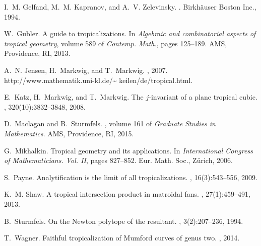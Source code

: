 \documentclass[11pt]{amsart}
\numberwithin{equation}{section}
\theoremstyle{plain}
\theoremstyle{definition}
\theoremstyle{remark}
\begin{document}
\begin{thebibliography}{10}
I.~M. Gelfand, M.~M. Kapranov, and A.~V. Zelevinsky.
.
\newblock Birkh\"auser Boston Inc., 1994.

W.~Gubler.
\newblock A guide to tropicalizations.
\newblock In {\em Algebraic and combinatorial aspects of tropical geometry},
  volume 589 of {\em Contemp. Math.}, pages 125--189. AMS,
  Providence, RI, 2013.

A.~N. Jensen, H.~Markwig, and T.~Markwig.
, 2007.
\newblock http://www.mathematik.uni-kl.de/\textasciitilde
  keilen/de/tropical.html.

E.~Katz, H.~Markwig, and T.~Markwig.
\newblock The {$j$}-invariant of a plane tropical cubic.
, 320(10):3832--3848, 2008.

D.~Maclagan and B.~Sturmfels.
, volume 161 of {\em
  Graduate Studies in Mathematics}.
\newblock AMS, Providence, RI, 2015.

G.~Mikhalkin.
\newblock Tropical geometry and its applications.
\newblock In {\em International {C}ongress of {M}athematicians. {V}ol. {II}},
  pages 827--852. Eur. Math. Soc., Z\"urich, 2006.

S.~Payne.
\newblock Analytification is the limit of all tropicalizations.
, 16(3):543--556, 2009.

K.~M. Shaw.
\newblock A tropical intersection product in matroidal fans.
, 27(1):459--491, 2013.

B.~Sturmfels.
\newblock On the {N}ewton polytope of the resultant.
, 3(2):207--236, 1994.

T.~Wagner.
\newblock Faithful tropicalization of {M}umford curves of genus two.
, 2014.
\end{thebibliography}
\end{document}
